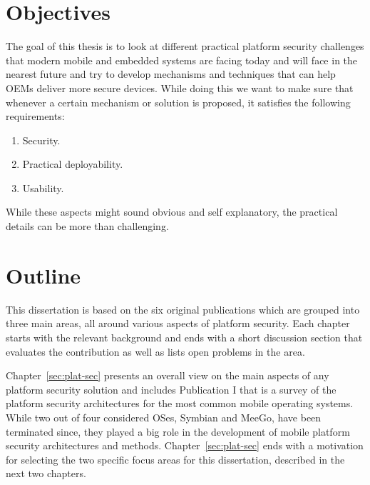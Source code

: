 \section{Objectives}
\label{sec:Objectives}

The goal of this thesis is to look at different practical platform security challenges that modern mobile and embedded systems are facing today and will face in the nearest future and try to develop mechanisms and techniques that can help OEMs deliver more secure devices. While doing this we want to make sure that whenever a certain mechanism or solution is proposed, it satisfies the following requirements:

\begin{enumerate}
	\item Security.  
	\item Practical deployability.
	\item Usability.	
\end{enumerate}

While these aspects might sound obvious and self explanatory, the practical details can be more than challenging.   

\section{Outline}

This dissertation is based on the six original publications which are grouped into three main areas, all around various aspects of platform security. Each chapter starts with the relevant background and ends with a short discussion section that evaluates the contribution as well as lists open problems in the area. 

Chapter~\ref{sec:plat-sec} presents an overall view on the main aspects of any platform security solution and includes Publication I that is a survey of the platform security architectures for the most common mobile operating systems. While two out of four considered OSes, Symbian and MeeGo, have been terminated since, they played a big role in the development of mobile platform security architectures and methods. Chapter~\ref{sec:plat-sec} ends with a motivation for selecting the two specific focus areas for this dissertation, described in the next two chapters. 

